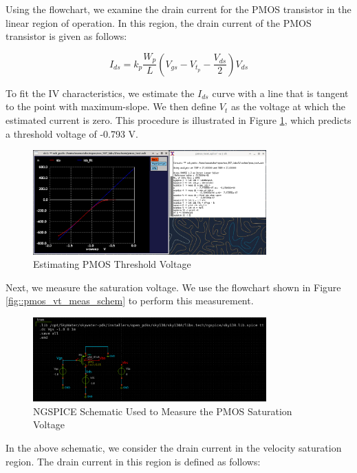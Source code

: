 \documentclass[fleqn]{article}
\begin{document}
	\noindent Using the flowchart, we examine the drain current for the PMOS transistor in the linear region of operation. In this region, the drain current of the PMOS transistor is given as follows:
	
	\begin{equation}
		I_{ds} = k_p\frac{W_p}{L}\left(V_{gs} - V_{t_p} - \frac{V_{ds}}{2}\right)V_{ds}
	\end{equation}
	
	\noindent To fit the IV characteristics, we estimate the $I_{ds}$ curve with a line that is tangent to the point with maximum-slope. We then define $V_t$ as the voltage at which the estimated current is zero. This procedure is illustrated in Figure \ref{fig::pmos_vt_meas}, which predicts a threshold voltage of -0.793 V.
	
	\begin{figure}[H]
		\centerline{\includegraphics[width=0.8\textwidth]{pmos_vt_meas.png}}
		\caption{Estimating PMOS Threshold Voltage}
		\label{fig::pmos_vt_meas}
	\end{figure}
	
	Next, we measure the saturation voltage. We use the flowchart shown in Figure \ref{fig::pmos_vt_meas_schem} to perform this measurement.
	
	\begin{figure}[H]
		\centerline{\includegraphics[width=0.8\textwidth]{pmos_vdsat_meas_schem.png}}
		\caption{NGSPICE Schematic Used to Measure the PMOS Saturation Voltage}
		\label{fig::pmos_vdsat_meas_schem}
	\end{figure}
	
	 \noindent In the above schematic, we consider the drain current in the velocity saturation region. The drain current in this region is defined as follows:
	
\end{document}
